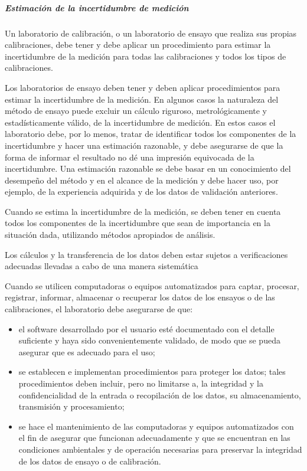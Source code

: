 \subparagraph{Estimación de la incertidumbre de medición} 
Un laboratorio de calibración, o un laboratorio de ensayo que realiza sus propias calibraciones,
debe tener y debe aplicar un procedimiento para estimar la incertidumbre de la medición para todas las
calibraciones y todos los tipos de calibraciones.

\par \noindent
Los laboratorios de ensayo deben tener y deben aplicar procedimientos para estimar la
incertidumbre de la medición. En algunos casos la naturaleza del método de ensayo puede excluir un cálculo
riguroso, metrológicamente y estadísticamente válido, de la incertidumbre de medición. En estos casos el
laboratorio debe, por lo menos, tratar de identificar todos los componentes de la incertidumbre y hacer una
estimación razonable, y debe asegurarse de que la forma de informar el resultado no dé una impresión
equivocada de la incertidumbre. Una estimación razonable se debe basar en un conocimiento del desempeño
del método y en el alcance de la medición y debe hacer uso, por ejemplo, de la experiencia adquirida y de los
datos de validación anteriores.

\par \noindent
Cuando se estima la incertidumbre de la medición, se deben tener en cuenta todos los
componentes de la incertidumbre que sean de importancia en la situación dada, utilizando métodos
apropiados de análisis.

\par \noindent
Los cálculos y la transferencia de los datos deben estar sujetos a verificaciones adecuadas
llevadas a cabo de una manera sistemática

\par \noindent
Cuando se utilicen computadoras o equipos automatizados para captar, procesar, registrar,
informar, almacenar o recuperar los datos de los ensayos o de las calibraciones, el laboratorio debe
asegurarse de que:

\begin{itemize}
	\item el software desarrollado por el usuario esté documentado con el detalle suficiente y haya sido
	convenientemente validado, de modo que se pueda asegurar que es adecuado para el uso;
	
	\item se establecen e implementan procedimientos para proteger los datos; tales procedimientos deben incluir,
	pero no limitarse a, la integridad y la confidencialidad de la entrada o recopilación de los datos, su
	almacenamiento, transmisión y procesamiento;
	
	\item se hace el mantenimiento de las computadoras y equipos automatizados con el fin de asegurar que
	funcionan adecuadamente y que se encuentran en las condiciones ambientales y de operación
	necesarias para preservar la integridad de los datos de ensayo o de calibración.
\end{itemize}

